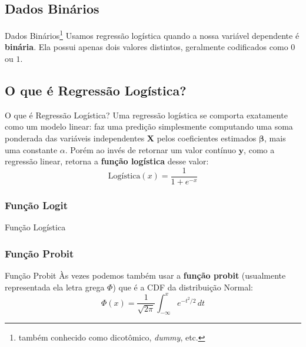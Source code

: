 \subsection{Dados Binários}
\begin{frame}{Dados Binários\footnote{também conhecido como dicotômico, \textit{dummy}, etc.}}
    Usamos regressão logística quando a nossa variável dependente é \textbf{binária}.
    Ela possui apenas dois valores distintos,
    geralmente codificados como $0$ ou $1$.
\end{frame}

\subsection{O que é Regressão Logística?}
\begin{frame}{O que é Regressão Logística?}
    Uma regressão logística se comporta exatamente como um modelo linear:
    faz uma predição simplesmente computando uma soma ponderada das variáveis
    independentes $\mathbf{X}$ pelos coeficientes estimados $\boldsymbol{\beta}$,
    mais uma constante $\alpha$. Porém ao invés de retornar um valor contínuo
    $\boldsymbol{y}$, como a regressão linear, retorna a \textbf{função logística}
    desse valor:
    $$
    \text{Logística}(x) = \frac{1}{1 + e^{-x}}
    $$
\end{frame}


\subsubsection{Função Logit}

\begin{frame}{Função Logística}
\end{frame}

\subsubsection{Função Probit}
\begin{frame}{Função Probit}
    Às vezes podemos também usar a \textbf{função probit} (usualmente representada
    ela letra grega $\Phi$) que é a CDF da distribuição Normal:
    $$
    \Phi (x)= \frac {1}{\sqrt {2 \pi}}\int _{-\infty }^{x}e^{-t^{2}/2}\,dt
    $$
\end{frame}

